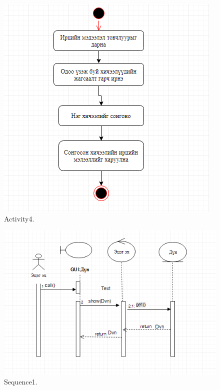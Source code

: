 \documentclass[12pt]{article}
\begin{document}
\begin{figure}
		\caption{Activity4.}
	\label{fig:a4}
	\includegraphics[width=\linewidth]{A4.png}
\end{figure}
\begin{figure}
		\caption{Sequence1.}
	\label{fig:s1}
	\includegraphics[width=\linewidth]{S1.png}
\end{figure}
\end{document}
